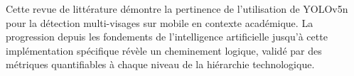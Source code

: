\begin{onehalfspace}
\hspace{0.65cm} Cette revue de littérature démontre la pertinence de l'utilisation de YOLOv5n pour la détection multi-visages sur mobile en contexte académique. La progression depuis les fondements de l'intelligence artificielle jusqu'à cette implémentation spécifique révèle un cheminement logique, validé par des métriques quantifiables à chaque niveau de la hiérarchie technologique.


\end{onehalfspace}